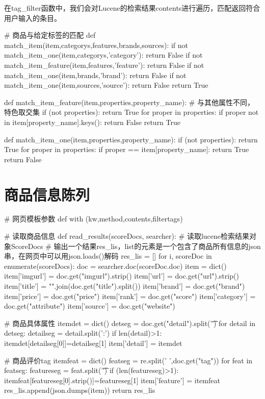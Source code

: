 在tag\_filter函数中，我们会对Lucene的检索结果contents进行遍历，匹配返回符合用户输入的条目。

\begin{python}
# 商品与给定标签的匹配
def match_item(item,categorys,features,brands,sources):
    if not match_item_one(item,categorys,'category'):
        return False
    if not match_item_feature(item,features,'feature'):
        return False
    if not match_item_one(item,brands,'brand'):
        return False
    if not match_item_one(item,sources,'source'):
        return False
    return True

def match_item_feature(item,properties,property_name):
    # 与其他属性不同，特色取交集
    if (not properties):
        return True
    for proper in properties:
        if proper not in item[property_name].keys():
            return False
    return True

def match_item_one(item,properties,property_name):
    if (not properties):
        return True
    for proper in properties:
        if proper == item[property_name]:
            return True
    return False
\end{python}





\section{商品信息陈列}

\begin{python}
# 网页模板参数
def with (kw,method,contents,filtertags)
\end{python}

\begin{python}
# 读取商品信息
def read_results(scoreDocs, searcher):
    # 读取lucene检索结果对象ScoreDocs
    # 输出一个结果res_lis，list的元素是一个包含了商品所有信息的json串，在网页中可以用json.loads()解码
    res_lis = []
    for i, scoreDoc in enumerate(scoreDocs):
        doc = searcher.doc(scoreDoc.doc)
        item = dict()
        item['imgurl'] = doc.get("imgurl").strip()
        item['url'] = doc.get("url").strip()
        item['title'] = "".join(doc.get("title").split())
        item['brand'] = doc.get("brand")
        item['price'] = doc.get("price")
        item['rank'] = doc.get("score")
        item['category'] = doc.get("attribute")
        item['source'] = doc.get("website")

        # 商品具体属性
        itemdet = dict()
        detseg = doc.get("detail").split('\t')
        for detail in detseg:
            detailseg = detail.split(':')
            if len(detail)>1:
                itemdet[detailseg[0]]=detailseg[1]
        item['detail'] = itemdet

        # 商品评价tag
        itemfeat = dict()
        featseg = re.split(' ',doc.get("tag"))
        for feat in featseg:
            featureseg = feat.split('\t')
            if (len(featureseg)>1):
                itemfeat[featureseg[0].strip()]=featureseg[1]
        item['feature'] = itemfeat
        res_lis.append(json.dumps(item))
    return res_lis
\end{python}




